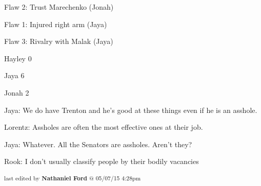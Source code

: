 
 {\color[RGB]{255,0,0}Flaw 2: Trust Marechenko (Jonah)} 

 {\color[RGB]{255,0,0}Flaw 1: Injured right arm (Jaya)} 

 {\color[RGB]{255,0,0}Flaw 3: Rivalry with Malak (Jaya)} 



Hayley 0

Jaya 6

Jonah 2



Jaya: We do have Trenton and he's good at these things even if he is an asshole.

Lorentz: Assholes are often the most effective ones at their job.



Jaya: Whatever. All the Senators are assholes.  Aren't they?

Rook: I don't usually classify people by their bodily vacancies




\iffalse

======================
THESE ARE ERRORS ENCOUNTERED DURING THE EXPORT PROCESS
======================

	Unable to highlight for footnote: I don’t know how obvious it was, but after the explosion, Hayley’s demeanor changed from the weepy mess she’s been the last few sessions.  Her movements are confident and assured, her voice calm and professional.  There is not a moment of hesitation when she shoots the guys.  All that Small Unit Tactics training that Rook drilled into the team is coming into fruition now.  Also, she doesn’t limp at all. because:GivenExpected“Please do. Thank you, Sir.”“Thank you, Sir.”

	Unable to find a matching comment for footnote: _Marked as resolved_

	Unable to find a matching comment for footnote: _Re-opened_


\fi

\vspace{\fill}

\begin{flushright}
\textsubscript{last edited by \textbf{Nathaniel Ford} @ 05/07/15 4:28pm}
\end{flushright}

